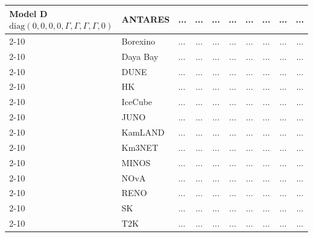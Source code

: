\begin{table}[H]
{\begin{tabular}{|l|l|l||c|c|c|c|c|c|c|}
\multirow{3}{*}{\parbox{3.2cm}{\centering 
Model D \\[0.5ex]
\scriptsize $\mathrm{diag}(0, 0, 0, 0, \Gamma, \Gamma, \Gamma, \Gamma, 0)$}}
        & ANTARES          & ... & ... & ... & ... & ... & ... & ... & ... \\ \cline{2-10}
        & Borexino         & ... & ... & ... & ... & ... & ... & ... & ... \\ \cline{2-10}
        & Daya Bay         & ... & ... & ... & ... & ... & ... & ... & ... \\ \cline{2-10}
        & DUNE             & ... & ... & ... & ... & ... & ... & ... & ... \\ \cline{2-10}
        & HK & ... & ... & ... & ... & ... & ... & ... & ... \\ \cline{2-10}
        & IceCube          & ... & ... & ... & ... & ... & ... & ... & ... \\ \cline{2-10}
        & JUNO             & ... & ... & ... & ... & ... & ... & ... & ... \\ \cline{2-10}
        & KamLAND          & ... & ... & ... & ... & ... & ... & ... & ... \\ \cline{2-10}
        & Km3NET           & ... & ... & ... & ... & ... & ... & ... & ... \\ \cline{2-10}
        & MINOS            & ... & ... & ... & ... & ... & ... & ... & ... \\ \cline{2-10}
        & NOvA             & ... & ... & ... & ... & ... & ... & ... & ... \\ \cline{2-10}
        & RENO             & ... & ... & ... & ... & ... & ... & ... & ... \\ \cline{2-10}
        & SK               & ... & ... & ... & ... & ... & ... & ... & ... \\ \cline{2-10}
        & T2K              & ... & ... & ... & ... & ... & ... & ... & ... \\ \hline \hline



\end{tabular}}
\end{table}
